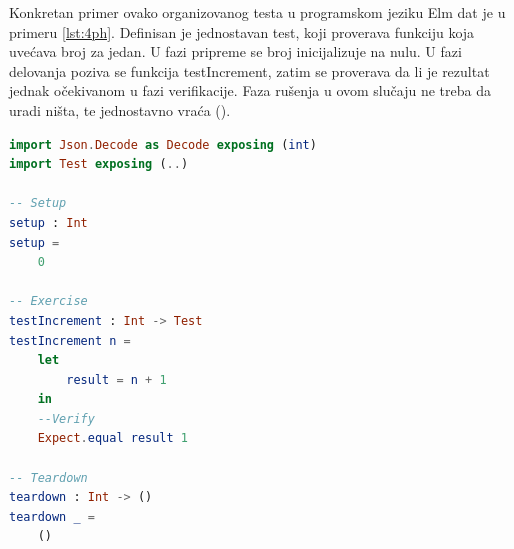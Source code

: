 \documentclass[12pt,oneside]{memoir}
\begin{document}
\par Konkretan primer ovako organizovanog testa u programskom jeziku Elm dat je u primeru \ref{lst:4ph}. Definisan je jednostavan test, koji proverava funkciju koja uvećava broj za jedan. U fazi pripreme se broj inicijalizuje na nulu. U fazi delovanja poziva se funkcija testIncrement, zatim se proverava da li je rezultat jednak očekivanom u fazi verifikacije. Faza rušenja u ovom slučaju ne treba da uradi ništa, te jednostavno vraća ().

\begin{lstlisting}[language=elm, caption={Četiri faze jediničnog testa},captionpos=b, label={lst:4ph}]
import Json.Decode as Decode exposing (int)
import Test exposing (..)

-- Setup
setup : Int
setup =
    0

-- Exercise
testIncrement : Int -> Test
testIncrement n =
    let
        result = n + 1
    in
    --Verify
    Expect.equal result 1

-- Teardown
teardown : Int -> ()
teardown _ =
    ()
\end{lstlisting}
\end{document}
